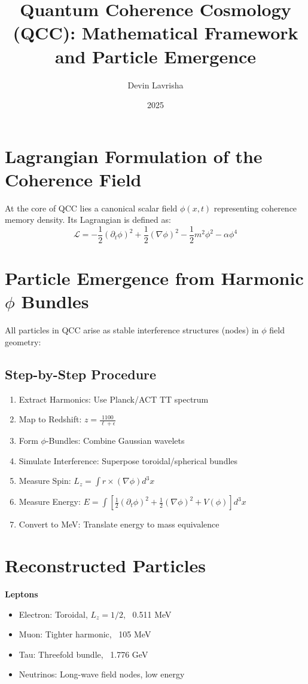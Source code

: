 \documentclass[12pt]{article}
\title{Quantum Coherence Cosmology (QCC): Mathematical Framework and Particle Emergence}
\author{Devin Lavrisha}
\date{2025}
\begin{document}
\maketitle

\section*{Lagrangian Formulation of the Coherence Field}
At the core of QCC lies a canonical scalar field $\phi(x, t)$ representing coherence memory density. Its Lagrangian is defined as:
\[
\mathcal{L} = -\frac{1}{2} (\partial_t \phi)^2 + \frac{1}{2} (\nabla \phi)^2 - \frac{1}{2} m^2 \phi^2 - \alpha \phi^4
\]

\section*{Particle Emergence from Harmonic $\phi$ Bundles}
All particles in QCC arise as stable interference structures (nodes) in $\phi$ field geometry:

\subsection*{Step-by-Step Procedure}
\begin{enumerate}
  \item Extract Harmonics: Use Planck/ACT TT spectrum
  \item Map to Redshift: $z = \frac{1100}{\ell + \epsilon}$
  \item Form $\phi$-Bundles: Combine Gaussian wavelets
  \item Simulate Interference: Superpose toroidal/spherical bundles
  \item Measure Spin: $L_z = \int r \times (\nabla \phi) d^3x$
  \item Measure Energy: $E = \int \left[ \frac{1}{2}(\partial_t \phi)^2 + \frac{1}{2}(\nabla \phi)^2 + V(\phi) \right] d^3x$
  \item Convert to MeV: Translate energy to mass equivalence
\end{enumerate}

\section*{Reconstructed Particles}
\textbf{Leptons}
\begin{itemize}
  \item Electron: Toroidal, $L_z=1/2$, ~0.511 MeV
  \item Muon: Tighter harmonic, ~105 MeV
  \item Tau: Threefold bundle, ~1.776 GeV
  \item Neutrinos: Long-wave field nodes, low energy
\end{itemize}
\end{document}
